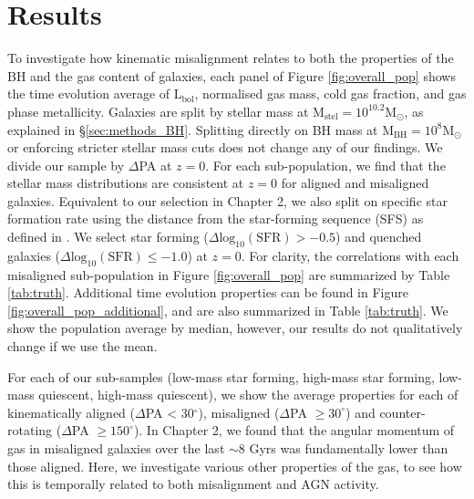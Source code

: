 \section{Results} \label{sec:results_BH}
To investigate how kinematic misalignment relates to both the properties of the BH and the gas content of galaxies, each panel of Figure \ref{fig:overall_pop} shows the time evolution average of $\mathrm{L_{bol}}$, normalised gas mass, cold gas fraction, and gas phase metallicity. Galaxies are split by stellar mass at $\mathrm{M_{stel} = 10^{10.2}M_{\odot}}$, as explained in \S\ref{sec:methods_BH}. Splitting directly on BH mass at $\mathrm{M_{BH} = 10^{8}M_{\odot}}$ or enforcing stricter stellar mass cuts does not change any of our findings. We divide our sample by $\Delta$PA at $z=0$. For each sub-population, we find that the stellar mass distributions are consistent at $z=0$ for aligned and misaligned galaxies. Equivalent to our selection in Chapter 2, we also split on specific star formation rate using the distance from the star-forming sequence (SFS) as defined in \citet{pillepich2019}. We select star forming ($\Delta \mathrm{log_{10}(SFR) > -0.5}$) and quenched galaxies ($\Delta \mathrm{log_{10}(SFR) \leq -1.0}$) at $z=0$. For clarity, the correlations with each misaligned sub-population in Figure \ref{fig:overall_pop} are summarized by Table \ref{tab:truth}. Additional time evolution properties can be found in Figure \ref{fig:overall_pop_additional}, and are also summarized in Table \ref{tab:truth}. We show the population average by median, however, our results do not qualitatively change if we use the mean. 

For each of our sub-samples (low-mass star forming, high-mass star forming, low-mass quiescent, high-mass quiescent), we show the average properties for each of kinematically aligned ($\Delta$PA < 30$^{\circ}$), misaligned ($\Delta$PA $\geq 30^{\circ}$) and counter-rotating ($\Delta$PA $\geq 150^{\circ}$). In Chapter 2, we found that the angular momentum of gas in misaligned galaxies over the last $\sim$8 Gyrs was fundamentally lower than those aligned. Here, we investigate various other properties of the gas, to see how this is temporally related to both misalignment and AGN activity.

